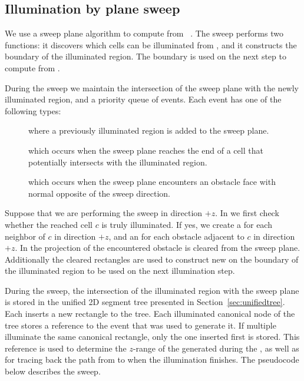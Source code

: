 \documentclass[english,gradu]{tktltiki2018}
\begin{document}
\subsection{Illumination by plane sweep}

We use a sweep plane algorithm to compute  from ~\cite{restricted}.
The sweep performs two functions: it discovers which cells can be illuminated from , and it constructs the boundary of the illuminated region.
The boundary is used on the next step to compute  from .

During the sweep we maintain the intersection of the sweep plane with the newly illuminated region, and a priority queue of events.
Each event has one of the following types:

\begin{description}
\item[\addE] where a previously illuminated region is added to the sweep plane.
\item[\cellE] which occurs when the sweep plane reaches the end of a cell that potentially intersects with the illuminated region.
\item[\obsE] which occurs when the sweep plane encounters an obstacle face with normal opposite of the sweep direction.
\end{description}

Suppose that we are performing the sweep in direction $+z$.
In \cellE we first check whether the reached cell $c$ is truly illuminated.
If yes, we create a \cellE for each neighbor of $c$ in direction $+z$, and an \obsE for each obstacle adjacent to $c$ in direction $+z$.
In \obsE the projection of the encountered obstacle is cleared from the sweep plane.
Additionally the cleared rectangles are used to construct new \addEs on the boundary of the illuminated region to be used on the next illumination step.

During the sweep, the intersection of the illuminated region with the sweep plane is stored in the unified 2D segment tree presented in Section~\ref{sec:unifiedtree}.
Each \addE inserts a new rectangle to the tree.
Each illuminated canonical node of the tree stores a reference to the event that was used to generate it.
If multiple \addEs illuminate the same canonical rectangle, only the one inserted first is stored.
This reference is used to determine the $z$-range of the \addEs generated during the \obsEs, as well as for tracing back the path from \ept to \spt when the illumination finishes.
The pseudocode below describes the sweep.
\end{document}
